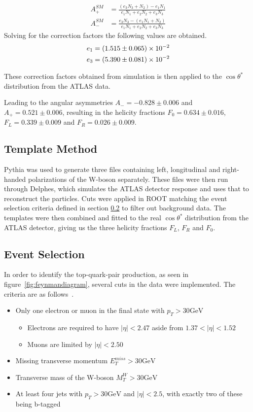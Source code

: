 \documentclass[12pt,a4paper]{article}
\numberwithin{equation}{section}
\begin{document}
\begin{align}
	A_{+}^{SM} &= \frac{(e_3N_3 + N_2) - e_1N_1}{e_1N_1 + e_2N_2 + e_3N_3} \\
	A_{-}^{SM} &= \frac{e_3N_3 - (e_1N_1 + N_2)}{e_1N_1 + e_2N_2 + e_3N_3}     
\end{align}
Solving for the correction factors the following values are obtained. 
\begin{align}
	e_1 &=  \num{1.515 +- 0.065E-2} \\ e_3 &= \num{5.390 +- 0.081E-2}
\end{align}

These correction factors obtained from simulation is then applied to the
$\cos\theta^{*}$ distribution from the ATLAS data.

Leading to the angular asymmetries $A_- = -0.828 \pm 0.006$ and
$A_+ = 0.521 \pm 0.006$, resulting in the helicity fractions
$F_0=0.634 \pm 0.016$, $F_L=0.339 \pm 0.009$ and $F_R=0.026 \pm 0.009$.

\subsection{Template Method}
Pythia was used to generate three files containing left, longitudinal and
right-handed polarizations of the W-boson separately. These files were then run
through Delphes, which simulates the ATLAS detector response and uses that to
reconstruct the particles. Cuts were applied in ROOT matching the event
selection criteria defined in section \ref{sec:cuts} to filter out background
data. The templates were then combined and fitted to the real $\cos \theta^{*}$
distribution from the ATLAS detector, giving us the three helicity fractions
$F_L$, $F_R$ and $F_0$.

\subsection{Event Selection}\label{sec:cuts}
In order to identify the top-quark-pair production, as seen in
figure~\ref{fig:feynmandiagram}, several cuts in the data were implemented. The
criteria are as follows~\cite{oreach2020}.
\begin{itemize}
  \item Only one electron or muon in the final state with $p_{T} > 30 \mathrm{GeV}$
  \begin{itemize}
    \item Electrons are required to have $|\eta| < 2.47$ aside from $1.37 < |\eta| < 1.52$
    \item Muons are limited by $|\eta| < 2.50$
  \end{itemize}
  \item Missing transverse momentum $E_{T}^{miss} > 30 \mathrm{GeV}$
  \item Transverse mass of the W-boson $M_{T}^{W} > 30 \mathrm{GeV}$
  \item At least four jets with $p_{T} > 30 \mathrm{GeV}$ and $|\eta| < 2.5$, with
        exactly two of these being b-tagged
\end{itemize}
\end{document}
